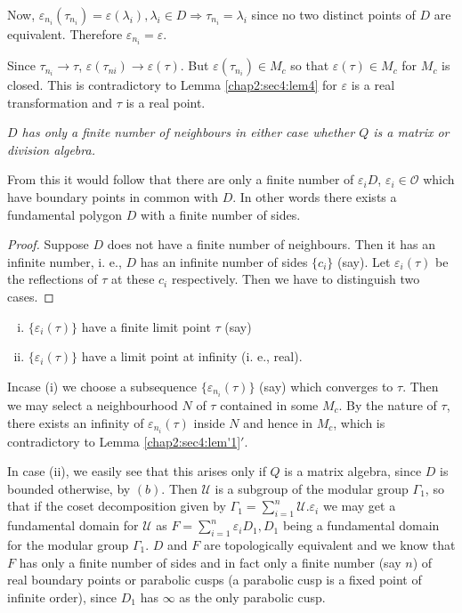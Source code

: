 Now, $\varepsilon _{n_i} (\tau_{n_i}) = \varepsilon (\lambda_i),
\lambda_i \in D \Longrightarrow \tau_{n_i} = \lambda _i$ since no two
distinct points of $D$ are equivalent. Therefore $\varepsilon _{n_i} =
\varepsilon$.  

 Since $\tau_{n_i} \to \tau$, $\varepsilon (\tau_{ni}) \to \varepsilon
 (\tau)$. But $\varepsilon (\tau _{n_i}) \in M_c$ so that $\varepsilon
 (\tau) \in M_c$ for $M_c$ is closed. This is contradictory to Lemma
 \ref{chap2:sec4:lem4}
 for $\varepsilon $ is a real transformation and $\tau$ is a real
 point.  
 
 \begin{theorem}\label{chap2:sec4:thmm2} %
   {\em $D$ has only a finite number of neighbours in either case
     whether $Q$ is a matrix or division algebra. } 
 \end{theorem} 

From this it would follow that there are only a finite number of
$\varepsilon_i D$, $\varepsilon_i \in \mathscr{O}$ which have boundary
points in common with $D$. In other words there exists a fundamental
polygon $D$ with a finite number of sides.  

\begin{proof}
  Suppose $D$ does not have a finite number of neighbours. Then it has
  an infinite number, i. e.,  $D$ has an infinite number of sides $\{
  c_i \}$ (say). Let $\varepsilon _i (\tau)$ be the reflections of
  $\tau$ at these $c_i$ respectively. Then we have to distinguish two
  cases.  
\end{proof}

\begin{enumerate}[(i)]
\item $\big\{ \varepsilon_i (\tau)\big\}$ have a finite limit point $\tau$ (say)
\item $\big\{ \varepsilon _i (\tau)\big\}$ have a limit point at
  infinity (i. e.,  real).  
\end{enumerate}

In\pageoriginale case (i) we choose a subsequence $\big\{ \varepsilon _{n_i}
(\tau)\big\}$ (say) which converges to $\tau$. Then we may select a
neighbourhood $N$ of $\tau$ contained in some $M_c$. By the nature of
$\tau$, there exists an infinity of $\varepsilon _{n_i}	 (\tau)$
inside $N$ and hence in $M_c$, which is contradictory to Lemma
\ref{chap2:sec4:lem'1}$'$.  

In case (ii), we easily see that this arises only if $Q$ is a matrix
algebra, since $D$ is bounded otherwise, by $(b)$. Then $\mathscr{U}$
is a subgroup of the modular group $\Gamma_1$, so that if the coset
decomposition given by $\Gamma _1 = \sum\limits_{i=1}^{n}
\mathscr{U}. \varepsilon_i$ we may get a fundamental domain for
$\mathscr{U}$ as $F = \sum\limits_{i=1}^{n} \varepsilon_i D_1,  D_1$
being a fundamental domain for the modular group $\Gamma_1$. $D$ and
$F$ are topologically equivalent and we know that $F$ has only a
finite number of sides and in fact only a finite number (say $n$) of
real boundary points or parabolic cusps (a parabolic cusp is a fixed
point of infinite order), since $D_1 $ has $\infty$ as the only
parabolic cusp.  

